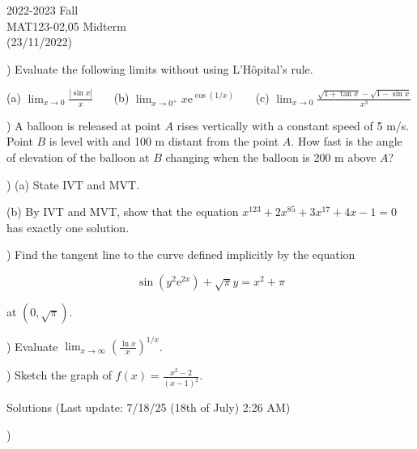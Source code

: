\documentclass{article}
\begin{document}
\large

\begin{center}
2022-2023 Fall \\MAT123-02,05 Midterm\\(23/11/2022)
\end{center}

) Evaluate the following limits without using L'Hôpital's rule.

\hfill

(a) $\displaystyle \lim_{x\to 0} \frac{\left|\sin x\right|}{x}$ \ \ \ (b) $\displaystyle \lim_{x\to 0^+}x\mathrm{e}^{\displaystyle \cos(1/x)}$ \ \ \ (c) $\displaystyle \lim_{x\to 0}{\frac{\sqrt{1+\tan x} -\sqrt{1-\sin x} }{x^3}}$

\hfill

) A balloon is released at point $A$ rises vertically with a constant speed of 5 m/s. Point $B$ is level with and 100 m distant from the point $A$. How fast is the angle of elevation of the balloon at $B$ changing when the balloon is 200 m above $A$?

\hfill

) (a) State IVT and MVT.

\hfill

\noindent (b) By IVT and MVT, show that the equation $x^{123}+2x^{85} + 3x^{17} + 4x-1 = 0$ has exactly one solution.

\hfill

) Find the tangent line to the curve defined implicitly by the equation

\begin{equation*}
\sin\left(y^2\mathrm{e}^{2x}\right) + \sqrt{\pi}y = x^2 + \pi
\end{equation*}

\noindent at $(0, \sqrt\pi).$

\hfill

) Evaluate $\displaystyle \lim_{x \to \infty} \left(\frac{\ln x}{x}\right)^{1/x}$.

\hfill

) Sketch the graph of $\displaystyle f(x) = \frac{x^2-2}{(x-1)^2}$.

\newpage

\begin{center}
Solutions (Last update: 7/18/25 (18th of July) 2:26 AM)
\end{center}

)

\hfill
\end{document}
